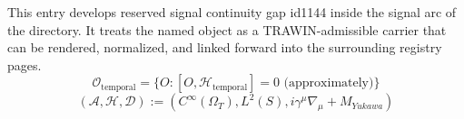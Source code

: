 
\begin{tzpsnapshot}
\end{tzpsnapshot}

This entry develops reserved signal continuity gap id1144 inside the signal arc of the directory. It treats the named object as a TRAWIN-admissible carrier that can be rendered, normalized, and linked forward into the surrounding registry pages.
\[
\mathcal{O}_{\text{temporal}} = \{O : [O, \mathcal{H}_{\text{temporal}}] = 0 \text{ (approximately)}\}
\]
\[
(\mathcal{A}, \mathcal{H}, \mathcal{D}) := (C^\infty(\Omega_T), L^2(S), i\gamma^\mu\nabla_\mu + M_{Yukawa})
\]

